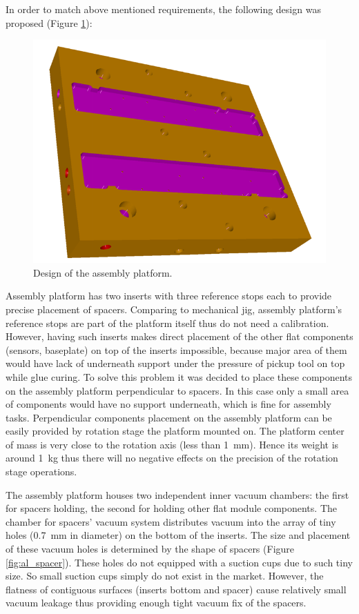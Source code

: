 In order to match above mentioned requirements, the following design was proposed (Figure \ref{fig:platform_design}):

\begin{figure}[ht]\centering
\includegraphics[width=0.7\linewidth]{Data/Module_assembly/Platform_design.png}
\caption{Design of the assembly platform.}
\label{fig:platform_design}
\end{figure}

Assembly platform has two inserts with three reference stops each to provide precise placement of spacers. Comparing to mechanical jig, assembly platform's reference stops are part of the platform itself thus do not need a calibration. However, having such inserts makes direct placement of the other flat components (sensors, baseplate) on top of the inserts impossible, because major area of them would have lack of underneath support under the pressure of pickup tool on top while glue curing. To solve this problem it was decided to place these components on the assembly platform perpendicular to spacers. In this case only a small area of components would have no support underneath, which is fine for assembly tasks. Perpendicular components placement on the assembly platform can be easily provided by rotation stage the platform mounted on. The platform center of mass is very close to the rotation axis (less than 1~mm). Hence its weight is around 1~kg thus there will no negative effects on the precision of the rotation stage operations. 

The assembly platform houses two independent inner vacuum chambers: the first for spacers holding, the second for holding other flat module components. The chamber for spacers' vacuum system distributes vacuum into the array of tiny holes (0.7~mm in diameter) on the bottom of the inserts. The size and placement of these vacuum holes is determined by the shape of spacers (Figure \ref{fig:al_spacer}). These holes do not equipped with a suction cups due to such tiny size. So small suction cups simply do not exist in the market. However, the flatness of contiguous surfaces (inserts bottom and spacer) cause relatively small vacuum leakage thus providing enough tight vacuum fix of the spacers.

